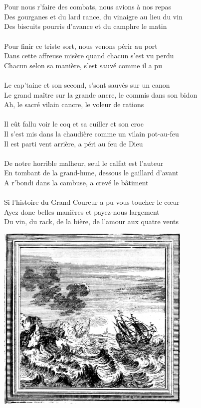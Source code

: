 \\\\Pour nous r'faire des combats, nous avions à nos repas
\\Des gourganes et du lard rance, du vinaigre au lieu du vin
\\Des biscuits pourris d'avance et du camphre le matin
\breakpage
\\\\Pour finir ce triste sort, nous venons périr au port
\\Dans cette affreuse misère quand chacun s'est vu perdu
\\Chacun selon sa manière, s'est sauvé comme il a pu
\\\\Le cap'taine et son second, s'sont sauvés sur un canon
\\Le grand maître sur la grande ancre, le commis dans son bidon
\\Ah, le sacré vilain cancre, le voleur de rations
\\\\Il eût fallu voir le coq et sa cuiller et son croc
\\Il s'est mis dans la chaudière comme un vilain pot-au-feu
\\Il est parti vent arrière, a péri au feu de Dieu
\\\\De notre horrible malheur, seul le calfat est l'auteur
\\En tombant de la grand-hune, dessous le gaillard d'avant
\\A r'bondi dans la cambuse, a crevé le bâtiment
\\\\Si l'histoire du Grand Coureur a pu vous toucher le cœur
\\Ayez donc belles manières et payez-nous largement
\\Du vin, du rack, de la bière, de l'amour aux quatre vents
\bigskip
\begin{center}
\includegraphics[width=0.7\textwidth]{images/brev11.png}
\end{center}

\breakpage